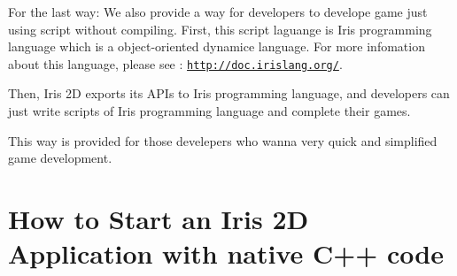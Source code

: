 \begin{DoxyParagraph}{For the last way\+:}
We also provide a way for developers to develope game just using script without compiling. First, this script laguange is Iris programming language which is a object-\/oriented dynamice language. For more infomation about this language, please see \+: \href{http://doc.irislang.org/}{\tt http\+://doc.\+irislang.\+org/}. 
\end{DoxyParagraph}
\begin{DoxyParagraph}{}
Then, Iris 2D exports its A\+P\+Is to Iris programming language, and developers can just write scripts of Iris programming language and complete their games. 
\end{DoxyParagraph}
\begin{DoxyParagraph}{}
This way is provided for those develepers who wanna very quick and simplified game development. 
\end{DoxyParagraph}
\hypertarget{index_install_sec_1}{}\section{How to Start an Iris 2\+D Application with native C++ code}\label{index_install_sec_1}

